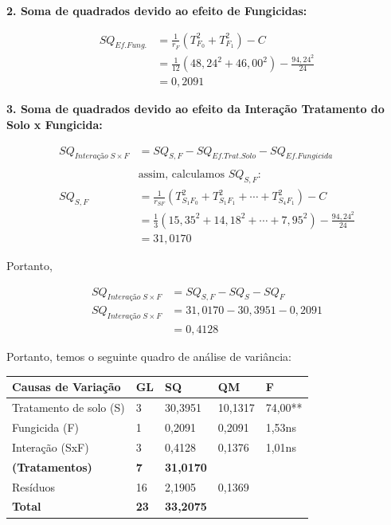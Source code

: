 \documentclass[
]{article}
\begin{document}
\textbf{2. Soma de quadrados devido ao efeito de Fungicidas:}

\[
\begin{aligned}
SQ_{Ef.Fung.} &= \frac{1}{r_F}(T_{F_0}^2+T_{F_1}^2) - C \\
                  &= \frac{1}{12}(48,24^2+46,00^2) - \frac{94,24^2}{24} \\
                  &= 0,2091
\end{aligned}
\]

\textbf{3. Soma de quadrados devido ao efeito da Interação Tratamento do
Solo x Fungicida:}

\[
\begin{aligned}
SQ_{Interação\;S\times F} &= SQ_{S,F}-SQ_{Ef.Trat.Solo}-SQ_{Ef.Fungicida} \\ \\
& \text{assim, calculamos } SQ_{S,F}: \\ 
SQ_{S,F} &= \frac{1}{r_{SF}}(T_{S_1F_0}^2+T_{S_1F_1}^2+\cdots +T_{S_4F_1}^2) - C \\
                  &= \frac{1}{3}(15,35^2+14,18^2+\cdots + 7,95^2) - \frac{94,24^2}{24} \\
                  &= 31,0170
\end{aligned}
\]

Portanto,

\[
\begin{aligned}
SQ_{Interação\;S\times F} &= SQ_{S,F}-SQ_{S}-SQ_{F} \\
SQ_{Interação\;S\times F} &= 31,0170-30,3951-0,2091 \\
&= 0,4128
\end{aligned}
\]

Portanto, temos o seguinte quadro de análise de variância:

\begin{longtable}[t]{lllll}
\toprule
Causas de Variação & GL & SQ & QM & F\\
\midrule
Tratamento de solo (S) & 3 & 30,3951 & 10,1317 & 74,00**\\
Fungicida (F) & 1 & 0,2091 & 0,2091 & 1,53ns\\
Interação (SxF) & 3 & 0,4128 & 0,1376 & 1,01ns\\
\textbf{(Tratamentos)} & \textbf{7} & \textbf{31,0170} & \textbf{} & \textbf{}\\
Resíduos & 16 & 2,1905 & 0,1369 & \\
\addlinespace
\textbf{Total} & \textbf{23} & \textbf{33,2075} & \textbf{} & \textbf{}\\
\bottomrule
\end{longtable}
\end{document}
